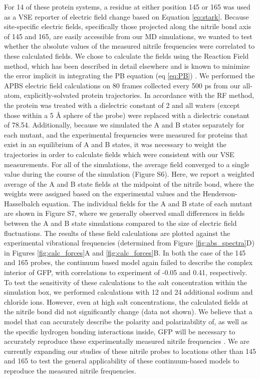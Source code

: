 For 14 of these protein systems, a \pCNF{} residue at either position 145 or 165 was used as a VSE reporter of electric field change based on Equation \ref{eq:stark}.
Because site-specific electric fields, specifically those projected along the nitrile bond axis of \pCNF{} 145 and 165, are easily accessible from our MD simulations, we wanted to test whether the absolute values of the measured nitrile frequencies were correlated to these calculated fields.
We chose to calculate the fields using the Reaction Field method, which has been described in detail elsewhere and is known to minimize the error implicit in integrating the PB equation (eq \ref{eq:PB}) \cite{Ritchie2015}.
We performed the APBS electric field calculations on 80 frames collected every 500 ps from our all-atom, explicitly-solvated protein trajectories.
In accordance with the RF method, the protein was treated with a dielectric constant of 2 and all waters (except those within a 5 \si{\angstrom} sphere of the \pCNF{} probe) were replaced with a dielectric constant of 78.54.
Additionally, because we simulated the A and B states separately for each mutant, and the experimental frequencies were measured for proteins that exist in an equilibrium of A and B states, it was necessary to weight the trajectories in order to calculate fields which were consistent with our VSE measurements.
For all of the simulations, the average field converged to a single value during the course of the simulation (Figure S6).
Here, we report a weighted average of the A and B state fields at the midpoint of the nitrile bond, where the weights were assigned based on the experimental \pKa{} values and the Henderson-Hasselbalch equation.
The individual fields for the A and B state of each mutant are shown in Figure S7, where we generally observed small differences in fields between the A and B state simulations compared to the size of electric field fluctuations.
The results of these field calculations are plotted against the experimental vibrational frequencies (determined from Figure \ref{fig:abs_spectra}D) in Figures \ref{fig:calc_forces}A and \ref{fig:calc_forces}B.
In both the case of the \pCNF{} 145 and 165 probes, the continuum based model again failed to describe the complex interior of GFP, with correlations to experiment of -0.05 and 0.41, respectively.
To test the sensitivity of these calculations to the salt concentration within the simulation box, we performed calculations with 12 and 24 additional sodium and chloride ions.
However, even at high salt concentrations, the calculated fields at the nitrile bond did not significantly change (data not shown).
We believe that a model that can accurately describe the polarity and polarizability of, as well as the specific hydrogen bonding interactions inside, GFP will be necessary to accurately reproduce these experimentally measured nitrile frequencies \cite{Blasiak2016}.
We are currently expanding our studies of these nitrile probes to locations other than 145 and 165 to test the general applicability of these continuum-based models to reproduce the measured nitrile frequencies.

